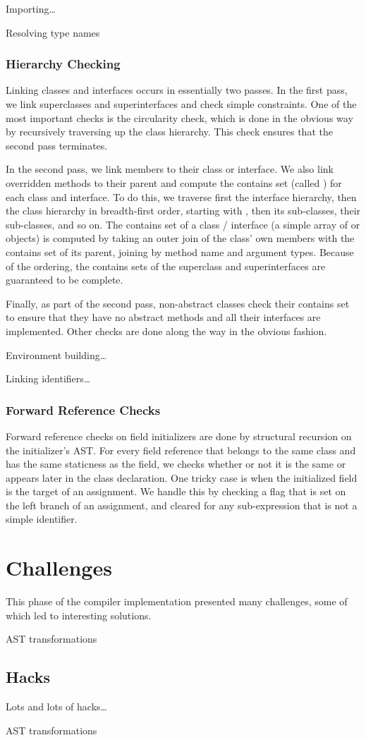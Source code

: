 \documentclass[pdftex,11pt,a4paper]{article}
\begin{document}
Importing\ldots

Resolving type names




\subsubsection{Hierarchy Checking}

Linking classes and interfaces occurs in essentially two passes. In the first
pass, we link superclasses and superinterfaces and check simple constraints. One
of the most important checks is the circularity check, which is done in the
obvious way by recursively traversing up the class hierarchy. This check ensures
that the second pass terminates.

In the second pass, we link members to their class or interface. We also link
overridden methods to their parent and compute the contains set (called
) for each class and interface. To do this, we traverse first
the interface hierarchy, then the class hierarchy in breadth-first order,
starting with , then its sub-classes, their sub-classes,
and so on. The contains set of a class / interface (a simple array of
 or  objects) is computed by taking an outer join of the
class' own members with the contains set of its parent, joining by method name
and argument types. Because of the ordering, the contains sets of the superclass
and superinterfaces are guaranteed to be complete.

Finally, as part of the second pass, non-abstract classes check their contains
set to ensure that they have no abstract methods and all their interfaces are
implemented. Other checks are done along the way in the obvious fashion.


Environment building\ldots


Linking identifiers\ldots


\subsubsection{Forward Reference Checks}

Forward reference checks on field initializers are done by structural recursion
on the initializer's AST. For every field reference that belongs to the same
class and has the same staticness as the field, we checks whether or not it is
the same or appears later in the class declaration. One tricky case is when the
initialized field is the target of an assignment. We handle this by checking a
flag that is set on the left branch of an assignment, and cleared for any
sub-expression that is not a simple identifier.


\section{Challenges}

This phase of the compiler implementation presented many
challenges, some of which led to interesting solutions.

AST transformations


\subsection{Hacks}

Lots and lots of hacks\ldots

AST transformations
\end{document}
